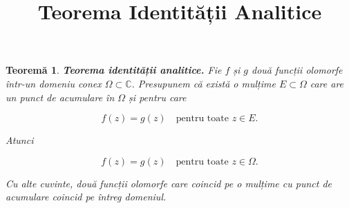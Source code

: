 \documentclass[12pt]{article}
\title{Teorema Identității Analitice}
\author{}
\date{}
\theoremstyle{plain}
\newtheorem{theorem}{Teoremă}
\begin{document}
\maketitle

\begin{theorem}
\textbf{Teorema identității analitice.}  
Fie $f$ și $g$ două funcții olomorfe într-un domeniu conex $\Omega \subset \mathbb{C}$.  
Presupunem că există o mulțime $E \subset \Omega$ care are un punct de acumulare în $\Omega$ și pentru care



\[
f(z) = g(z) \quad \text{pentru toate } z \in E.
\]



Atunci



\[
f(z) = g(z) \quad \text{pentru toate } z \in \Omega.
\]



Cu alte cuvinte, două funcții olomorfe care coincid pe o mulțime cu punct de acumulare coincid pe întreg domeniul.
\end{theorem}
\end{document}
